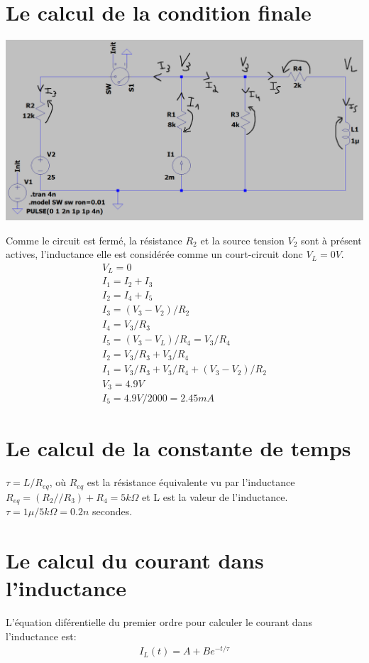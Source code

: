\documentclass{homeworg}
\begin{document}
\section{Le calcul de la condition finale}
    \begin{center}
        \includegraphics[scale=0.35]{Ifinal.png}
    \end{center}
    Comme le circuit est fermé, la résistance $R_2$ et la source tension $V_2$ sont à présent actives, l'inductance elle est considérée comme un court-circuit donc $V_L = 0V$.
    \begin{align}
        V_L = 0\\
        I_1 = I_2 + I_3\\
        I_2 = I_4 + I_5\\
        I_3 = (V_3 - V_2) / R_2\\
        I_4 = V_3 / R_3\\
        I_5 = (V_3 - V_L) / R_4 = V_3 / R_4\\
        I_2 = V_3 / R_3 + V_3 / R_4\\
        I_1 = V_3 / R_3 + V_3 / R_4 + (V_3 - V_2) / R_2\\
        V_3 = 4.9V\\
        I_5 = 4.9V / 2000 = 2.45mA
    \end{align}

\section{Le calcul de la constante de temps}
$\tau = L / R_{eq}$, où $R_{eq}$ est la résistance équivalente vu par l'inductance $R_{eq} = (R_2 // R_3) + R_4 = 5k\Omega$ et L est la valeur de l'inductance. $\tau = 1\mu / 5k\Omega = 0.2n$ secondes.

\section{Le calcul du courant dans l'inductance}
L’équation diférentielle du premier ordre pour calculer le courant dans l'inductance est:
\begin{align}
     I_L(t) = A + B e^{-t / \tau}
\end{align}
\end{document}
